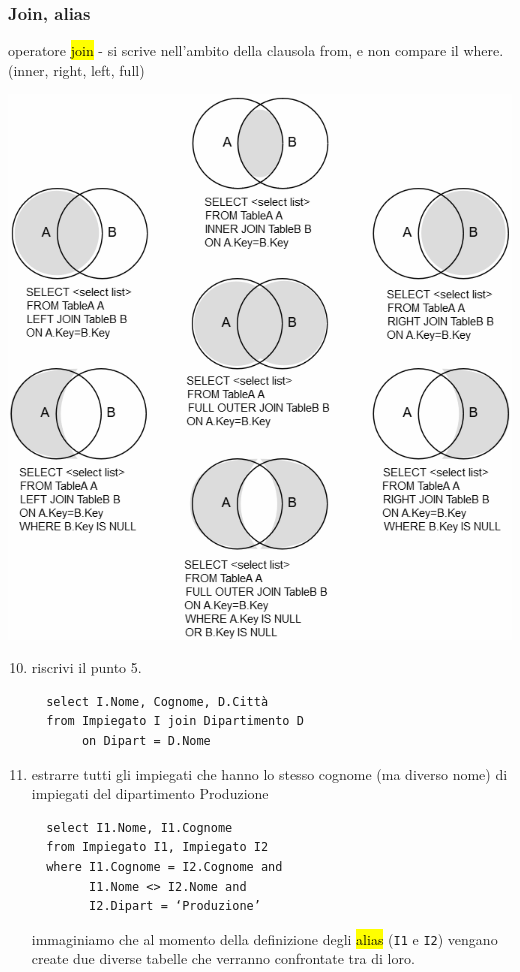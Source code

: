 \documentclass[a4paper]{article}
\begin{document}
\subsubsection{Join, alias}
operatore \hl{join} - si scrive nell’ambito della clausola from, e non compare il where. (inner, right, left, full)
\begin{center}
      \includegraphics[scale=0.5]{img/sql2.png}
\end{center}
\begin{enumerate}[leftmargin=*]
  \setcounter{enumi}{9}
  \item riscrivi il punto 5.
  \begin{verbatim}
  select I.Nome, Cognome, D.Città
  from Impiegato I join Dipartimento D
       on Dipart = D.Nome
  \end{verbatim}

  \item estrarre tutti gli impiegati che hanno lo stesso cognome (ma diverso nome) di impiegati del dipartimento Produzione
  \begin{verbatim}
  select I1.Nome, I1.Cognome
  from Impiegato I1, Impiegato I2
  where I1.Cognome = I2.Cognome and
        I1.Nome <> I2.Nome and
        I2.Dipart = ‘Produzione’
  \end{verbatim}
  immaginiamo che al momento della definizione degli \hl{alias} (\texttt{I1} e \texttt{I2}) vengano create due diverse tabelle che verranno confrontate tra di loro.
\end{enumerate}
\end{document}
